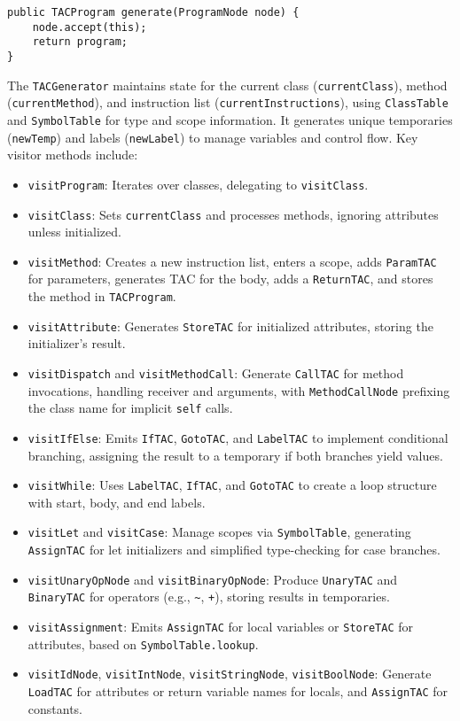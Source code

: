 \documentclass[11pt, titlepage]{article}
\begin{document}
\begin{lstlisting}
public TACProgram generate(ProgramNode node) {
    node.accept(this);
    return program;
}
\end{lstlisting}

The \texttt{TACGenerator} maintains state for the current class (\texttt{currentClass}), method (\texttt{currentMethod}), and instruction list (\texttt{currentInstructions}), using \texttt{ClassTable} and \texttt{SymbolTable} for type and scope information. It generates unique temporaries (\texttt{newTemp}) and labels (\texttt{newLabel}) to manage variables and control flow. Key visitor methods include:

\begin{itemize}[leftmargin=*]
    \item \texttt{visitProgram}: Iterates over classes, delegating to \texttt{visitClass}.
    \item \texttt{visitClass}: Sets \texttt{currentClass} and processes methods, ignoring attributes unless initialized.
    \item \texttt{visitMethod}: Creates a new instruction list, enters a scope, adds \texttt{ParamTAC} for parameters, generates TAC for the body, adds a \texttt{ReturnTAC}, and stores the method in \texttt{TACProgram}.
    \item \texttt{visitAttribute}: Generates \texttt{StoreTAC} for initialized attributes, storing the initializer's result.
    \item \texttt{visitDispatch} and \texttt{visitMethodCall}: Generate \texttt{CallTAC} for method invocations, handling receiver and arguments, with \texttt{MethodCallNode} prefixing the class name for implicit \texttt{self} calls.
    \item \texttt{visitIfElse}: Emits \texttt{IfTAC}, \texttt{GotoTAC}, and \texttt{LabelTAC} to implement conditional branching, assigning the result to a temporary if both branches yield values.
    \item \texttt{visitWhile}: Uses \texttt{LabelTAC}, \texttt{IfTAC}, and \texttt{GotoTAC} to create a loop structure with start, body, and end labels.
    \item \texttt{visitLet} and \texttt{visitCase}: Manage scopes via \texttt{SymbolTable}, generating \texttt{AssignTAC} for let initializers and simplified type-checking for case branches.
    \item \texttt{visitUnaryOpNode} and \texttt{visitBinaryOpNode}: Produce \texttt{UnaryTAC} and \texttt{BinaryTAC} for operators (e.g., \texttt{\textasciitilde}, \texttt{+}), storing results in temporaries.
    \item \texttt{visitAssignment}: Emits \texttt{AssignTAC} for local variables or \texttt{StoreTAC} for attributes, based on \texttt{SymbolTable.lookup}.
    \item \texttt{visitIdNode}, \texttt{visitIntNode}, \texttt{visitStringNode}, \texttt{visitBoolNode}: Generate \texttt{LoadTAC} for attributes or return variable names for locals, and \texttt{AssignTAC} for constants.
\end{itemize}
\end{document}
